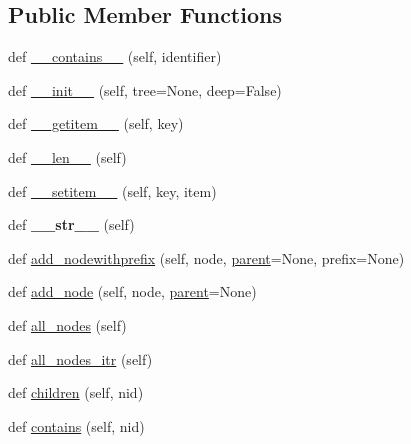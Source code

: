 \subsection*{Public Member Functions}
\begin{DoxyCompactItemize}
\item 
def \mbox{\hyperlink{classtreelib_1_1tree_1_1Tree_adb243cbf617b5193f24d53812719f13f}{\+\_\+\+\_\+contains\+\_\+\+\_\+}} (self, identifier)
\item 
def \mbox{\hyperlink{classtreelib_1_1tree_1_1Tree_ab6e19ed5aabb69d4a540bbcfa132fe25}{\+\_\+\+\_\+init\+\_\+\+\_\+}} (self, tree=None, deep=False)
\item 
def \mbox{\hyperlink{classtreelib_1_1tree_1_1Tree_a7613b0d4d9e7d28211a94bbea40aa37c}{\+\_\+\+\_\+getitem\+\_\+\+\_\+}} (self, key)
\item 
def \mbox{\hyperlink{classtreelib_1_1tree_1_1Tree_a9a932229a9eac3fa55c59e0c238cc1a5}{\+\_\+\+\_\+len\+\_\+\+\_\+}} (self)
\item 
def \mbox{\hyperlink{classtreelib_1_1tree_1_1Tree_afeacd37545576d851b136e85497a0a78}{\+\_\+\+\_\+setitem\+\_\+\+\_\+}} (self, key, item)
\item 
\mbox{\label{classtreelib_1_1tree_1_1Tree_a88cc6ad02932a464c7817aa94abb006d}} 
def {\bfseries \+\_\+\+\_\+str\+\_\+\+\_\+} (self)
\item 
def \mbox{\hyperlink{classtreelib_1_1tree_1_1Tree_a757cf54d27a10e32a9f30ee0e1bbde28}{add\+\_\+nodewithprefix}} (self, node, \mbox{\hyperlink{classtreelib_1_1tree_1_1Tree_a5b3ff09f1a10d49460888cdfa2c5ac0d}{parent}}=None, prefix=None)
\item 
def \mbox{\hyperlink{classtreelib_1_1tree_1_1Tree_a82d946c1c679ffe37d2c19a40ae2ac14}{add\+\_\+node}} (self, node, \mbox{\hyperlink{classtreelib_1_1tree_1_1Tree_a5b3ff09f1a10d49460888cdfa2c5ac0d}{parent}}=None)
\item 
def \mbox{\hyperlink{classtreelib_1_1tree_1_1Tree_a55265009dc743cdd46eb1033d9a1e636}{all\+\_\+nodes}} (self)
\item 
def \mbox{\hyperlink{classtreelib_1_1tree_1_1Tree_af227a9cdab23e258c061a82a8f76a7db}{all\+\_\+nodes\+\_\+itr}} (self)
\item 
def \mbox{\hyperlink{classtreelib_1_1tree_1_1Tree_aff4f1430d4718c01198d2cc8ea55d936}{children}} (self, nid)
\item 
def \mbox{\hyperlink{classtreelib_1_1tree_1_1Tree_a6c83066ff561408de6f8670f36ed6ad7}{contains}} (self, nid)
\item 

\end{DoxyCompactItemize}
